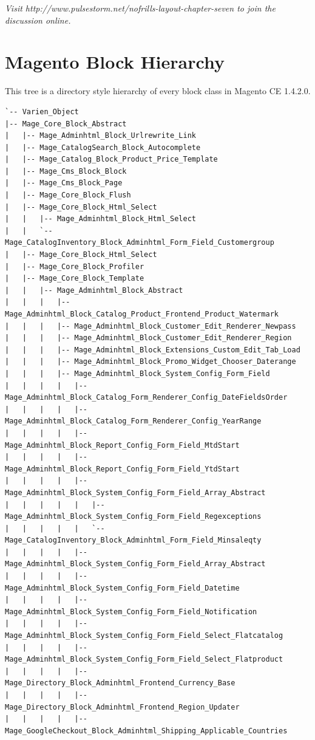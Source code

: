 \documentclass[oneside]{book}
\begin{document}
\emph{Visit http://www.pulsestorm.net/nofrills-layout-chapter-seven to join the discussion online.}
\appendix
\chapter{Magento Block Hierarchy}
This tree is a directory style hierarchy of every block class in Magento CE 1.4.2.0.

\begin{lstlisting}
`-- Varien_Object
|-- Mage_Core_Block_Abstract
|   |-- Mage_Adminhtml_Block_Urlrewrite_Link
|   |-- Mage_CatalogSearch_Block_Autocomplete
|   |-- Mage_Catalog_Block_Product_Price_Template
|   |-- Mage_Cms_Block_Block
|   |-- Mage_Cms_Block_Page
|   |-- Mage_Core_Block_Flush
|   |-- Mage_Core_Block_Html_Select
|   |   |-- Mage_Adminhtml_Block_Html_Select
|   |   `-- Mage_CatalogInventory_Block_Adminhtml_Form_Field_Customergroup
|   |-- Mage_Core_Block_Html_Select
|   |-- Mage_Core_Block_Profiler
|   |-- Mage_Core_Block_Template
|   |   |-- Mage_Adminhtml_Block_Abstract
|   |   |   |-- Mage_Adminhtml_Block_Catalog_Product_Frontend_Product_Watermark
|   |   |   |-- Mage_Adminhtml_Block_Customer_Edit_Renderer_Newpass
|   |   |   |-- Mage_Adminhtml_Block_Customer_Edit_Renderer_Region
|   |   |   |-- Mage_Adminhtml_Block_Extensions_Custom_Edit_Tab_Load
|   |   |   |-- Mage_Adminhtml_Block_Promo_Widget_Chooser_Daterange
|   |   |   |-- Mage_Adminhtml_Block_System_Config_Form_Field
|   |   |   |   |-- Mage_Adminhtml_Block_Catalog_Form_Renderer_Config_DateFieldsOrder
|   |   |   |   |-- Mage_Adminhtml_Block_Catalog_Form_Renderer_Config_YearRange
|   |   |   |   |-- Mage_Adminhtml_Block_Report_Config_Form_Field_MtdStart
|   |   |   |   |-- Mage_Adminhtml_Block_Report_Config_Form_Field_YtdStart
|   |   |   |   |-- Mage_Adminhtml_Block_System_Config_Form_Field_Array_Abstract
|   |   |   |   |   |-- Mage_Adminhtml_Block_System_Config_Form_Field_Regexceptions
|   |   |   |   |   `-- Mage_CatalogInventory_Block_Adminhtml_Form_Field_Minsaleqty
|   |   |   |   |-- Mage_Adminhtml_Block_System_Config_Form_Field_Array_Abstract
|   |   |   |   |-- Mage_Adminhtml_Block_System_Config_Form_Field_Datetime
|   |   |   |   |-- Mage_Adminhtml_Block_System_Config_Form_Field_Notification
|   |   |   |   |-- Mage_Adminhtml_Block_System_Config_Form_Field_Select_Flatcatalog
|   |   |   |   |-- Mage_Adminhtml_Block_System_Config_Form_Field_Select_Flatproduct
|   |   |   |   |-- Mage_Directory_Block_Adminhtml_Frontend_Currency_Base
|   |   |   |   |-- Mage_Directory_Block_Adminhtml_Frontend_Region_Updater
|   |   |   |   |-- Mage_GoogleCheckout_Block_Adminhtml_Shipping_Applicable_Countries

\end{lstlisting}
\end{document}
